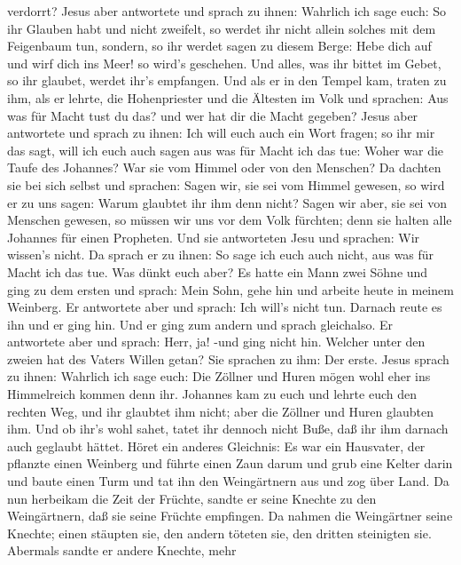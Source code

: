 verdorrt?  Jesus aber antwortete und sprach zu ihnen:
Wahrlich ich sage euch: So ihr Glauben habt und nicht zweifelt, so
werdet ihr nicht allein solches mit dem Feigenbaum tun, sondern, so ihr
werdet sagen zu diesem Berge: Hebe dich auf und wirf dich ins Meer! so
wird's geschehen.  Und alles, was ihr bittet im Gebet, so
ihr glaubet, werdet ihr's empfangen.  Und als er in den
Tempel kam, traten zu ihm, als er lehrte, die Hohenpriester und die
Ältesten im Volk und sprachen: Aus was für Macht tust du das? und wer
hat dir die Macht gegeben?  Jesus aber antwortete und
sprach zu ihnen: Ich will euch auch ein Wort fragen; so ihr mir das
sagt, will ich euch auch sagen aus was für Macht ich das tue:
 Woher war die Taufe des Johannes? War sie vom Himmel oder
von den Menschen? Da dachten sie bei sich selbst und sprachen: Sagen
wir, sie sei vom Himmel gewesen, so wird er zu uns sagen: Warum glaubtet
ihr ihm denn nicht?  Sagen wir aber, sie sei von Menschen
gewesen, so müssen wir uns vor dem Volk fürchten; denn sie halten alle
Johannes für einen Propheten.  Und sie antworteten Jesu und
sprachen: Wir wissen's nicht. Da sprach er zu ihnen: So sage ich euch
auch nicht, aus was für Macht ich das tue.  Was dünkt euch
aber? Es hatte ein Mann zwei Söhne und ging zu dem ersten und sprach:
Mein Sohn, gehe hin und arbeite heute in meinem Weinberg. 
Er antwortete aber und sprach: Ich will's nicht tun. Darnach reute es
ihn und er ging hin.  Und er ging zum andern und sprach
gleichalso. Er antwortete aber und sprach: Herr, ja! -und ging nicht
hin.  Welcher unter den zweien hat des Vaters Willen getan?
Sie sprachen zu ihm: Der erste. Jesus sprach zu ihnen: Wahrlich ich sage
euch: Die Zöllner und Huren mögen wohl eher ins Himmelreich kommen denn
ihr.  Johannes kam zu euch und lehrte euch den rechten Weg,
und ihr glaubtet ihm nicht; aber die Zöllner und Huren glaubten ihm. Und
ob ihr's wohl sahet, tatet ihr dennoch nicht Buße, daß ihr ihm darnach
auch geglaubt hättet.  Höret ein anderes Gleichnis: Es war
ein Hausvater, der pflanzte einen Weinberg und führte einen Zaun darum
und grub eine Kelter darin und baute einen Turm und tat ihn den
Weingärtnern aus und zog über Land.  Da nun herbeikam die
Zeit der Früchte, sandte er seine Knechte zu den Weingärtnern, daß sie
seine Früchte empfingen.  Da nahmen die Weingärtner seine
Knechte; einen stäupten sie, den andern töteten sie, den dritten
steinigten sie.  Abermals sandte er andere Knechte, mehr
